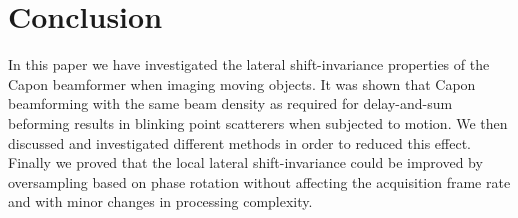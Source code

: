 \documentclass[journal]{IEEEtran}
\begin{document}

\section{Conclusion}\label{sec:con}
In this paper we have investigated the lateral shift-invariance properties of the Capon beamformer when imaging moving objects. It was shown that Capon beamforming with the same beam density as required for delay-and-sum beforming results in blinking point scatterers when subjected to motion.  We then discussed and investigated different methods in order to reduced this effect. Finally we proved that the local lateral shift-invariance could be improved by oversampling based on phase rotation without affecting the acquisition frame rate and with minor changes in processing complexity.


%
%

\end{document}

